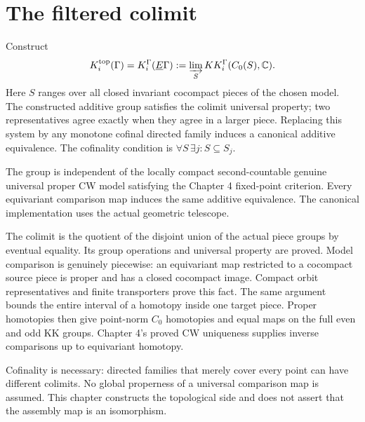 \section{The filtered colimit}
\begin{definition}\label{def:topological-side}
\leanok
Construct
\[
 K_i^{\mathrm{top}}(\Gamma)=K_i^\Gamma(\underline E\Gamma)
 :=\varinjlim_S KK_i^\Gamma(C_0(S),\mathbb C).
\]
Here $S$ ranges over all closed invariant cocompact pieces of the chosen
model. The constructed additive group satisfies the colimit universal
property; two representatives agree exactly when they agree in a larger
piece. Replacing this system by any monotone cofinal directed family
induces a canonical additive equivalence. The cofinality condition is
$\forall S\,\exists j\colon S\subseteq S_j$.

The group is independent of the locally compact second-countable genuine
universal proper CW model satisfying the Chapter 4 fixed-point criterion.
Every equivariant comparison map induces the same additive equivalence.
The canonical implementation uses the actual geometric telescope.
\end{definition}

The colimit is the quotient of the disjoint union of the actual piece groups
by eventual equality. Its group operations and universal property are proved.
Model comparison is genuinely piecewise: an equivariant map restricted to
a cocompact source piece is proper and has a closed cocompact image.
Compact orbit representatives and finite transporters prove this fact.
The same argument bounds the entire interval of a homotopy inside one
target piece. Proper homotopies then give point-norm $C_0$ homotopies and
equal maps on the full even and odd KK groups. Chapter 4's proved CW
uniqueness supplies inverse comparisons up to equivariant homotopy.

Cofinality is necessary: directed families that merely cover every point
can have different colimits. No global properness of a universal comparison
map is assumed. This chapter constructs the topological side and does not
assert that the assembly map is an isomorphism.
